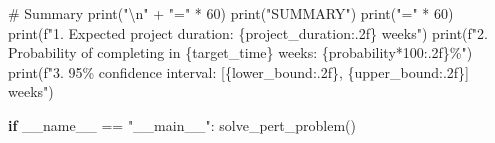 \documentclass[
  letterpaper,
  DIV=11,
  numbers=noendperiod]{scrreprt}
\newenvironment{Shaded}{\begin{snugshade}}{\end{snugshade}}
\newcommand{\BuiltInTok}[1]{\textcolor[rgb]{0.00,0.23,0.31}{#1}}
\newcommand{\CharTok}[1]{\textcolor[rgb]{0.13,0.47,0.30}{#1}}
\newcommand{\CommentTok}[1]{\textcolor[rgb]{0.37,0.37,0.37}{#1}}
\newcommand{\ControlFlowTok}[1]{\textcolor[rgb]{0.00,0.23,0.31}{\textbf{#1}}}
\newcommand{\DecValTok}[1]{\textcolor[rgb]{0.68,0.00,0.00}{#1}}
\newcommand{\NormalTok}[1]{\textcolor[rgb]{0.00,0.23,0.31}{#1}}
\newcommand{\OperatorTok}[1]{\textcolor[rgb]{0.37,0.37,0.37}{#1}}
\newcommand{\SpecialCharTok}[1]{\textcolor[rgb]{0.37,0.37,0.37}{#1}}
\newcommand{\SpecialStringTok}[1]{\textcolor[rgb]{0.13,0.47,0.30}{#1}}
\newcommand{\StringTok}[1]{\textcolor[rgb]{0.13,0.47,0.30}{#1}}
\newcommand{\VariableTok}[1]{\textcolor[rgb]{0.07,0.07,0.07}{#1}}
\begin{document}
\begin{Shaded}
\begin{Highlighting}[]
    \CommentTok{\# Summary}
    \BuiltInTok{print}\NormalTok{(}\StringTok{"}\CharTok{\textbackslash{}n}\StringTok{"} \OperatorTok{+} \StringTok{"="} \OperatorTok{*} \DecValTok{60}\NormalTok{)}
    \BuiltInTok{print}\NormalTok{(}\StringTok{"SUMMARY"}\NormalTok{)}
    \BuiltInTok{print}\NormalTok{(}\StringTok{"="} \OperatorTok{*} \DecValTok{60}\NormalTok{)}
    \BuiltInTok{print}\NormalTok{(}\SpecialStringTok{f"1. Expected project duration: }\SpecialCharTok{\{}\NormalTok{project\_duration}\SpecialCharTok{:.2f\}}\SpecialStringTok{ weeks"}\NormalTok{)}
    \BuiltInTok{print}\NormalTok{(}\SpecialStringTok{f"2. Probability of completing in }\SpecialCharTok{\{}\NormalTok{target\_time}\SpecialCharTok{\}}\SpecialStringTok{ weeks: }\SpecialCharTok{\{}\NormalTok{probability}\OperatorTok{*}\DecValTok{100}\SpecialCharTok{:.2f\}}\SpecialStringTok{\%"}\NormalTok{)}
    \BuiltInTok{print}\NormalTok{(}\SpecialStringTok{f"3. 95\% confidence interval: [}\SpecialCharTok{\{}\NormalTok{lower\_bound}\SpecialCharTok{:.2f\}}\SpecialStringTok{, }\SpecialCharTok{\{}\NormalTok{upper\_bound}\SpecialCharTok{:.2f\}}\SpecialStringTok{] weeks"}\NormalTok{)}


\ControlFlowTok{if} \VariableTok{\_\_name\_\_} \OperatorTok{==} \StringTok{"\_\_main\_\_"}\NormalTok{:}
\NormalTok{    solve\_pert\_problem()}
\end{Highlighting}
\end{Shaded}
\end{document}
